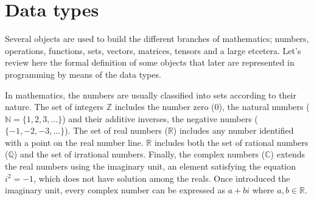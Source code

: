 






    \section{Data types}
    
Several objects are used to build the different branches of mathematics; numbers, operations, functions, sets, vectors, matrices, tensors and a large etcetera. 
Let's review here the formal definition of some objects that later are represented in programming by means of the data types. 

In mathematics, the numbers are usually classified into sets according to their nature.
The set of integers $\mathbb{Z}$ includes the number zero (0), the natural numbers ($\mathbb{N} = \{ 1,2,3,... \}$) and their additive inverses, the negative numbers ($\{ -1,-2,-3,... \}$).
The set of real numbers ($\mathbb{R}$) includes any number identified with a point on the real number line.
$\mathbb{R}$ includes both the set of rational numbers ($\mathbb{Q}$) and the set of irrational numbers.
Finally, the complex numbers ($\mathbb{C}$) extends the real numbers using the imaginary unit, an element satisfying the equation $i^2 = -1$, which does not have solution among the reals.
Once introduced the imaginary unit, every complex number can be expressed as $a+bi$ where $a,b\in\mathbb{R}$. 

